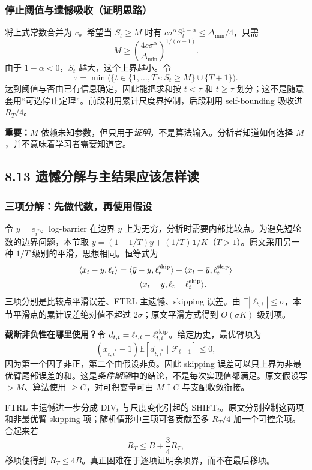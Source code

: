 \subsubsection{停止阈值与遗憾吸收（证明思路）}
将上式常数合并为 $c$。希望当 $S_t\ge M$ 时有 $c\sigma^\alpha S_t^{1-\alpha}\le\Delta_{\min}/4$，只需
\[
M\ge\left(\frac{4c\sigma^\alpha}{\Delta_{\min}}\right)^{1/(\alpha-1)}.
\]
由于 $1-\alpha<0$，$S_t$ 越大，这个上界越小。令
\[
\tau=\min\bigl(\{t\in\{1,\ldots,T\}:S_t\ge M\}\cup\{T+1\}\bigr).
\]
达到阈值与否由已有信息确定，因此能把求和按 $t<\tau$ 和 $t\ge\tau$ 划分；这不是随意套用“可选停止定理”。前段利用累计尺度界控制，后段利用 self-bounding 吸收进 $R_T/4$。

\textbf{重要：}$M$ 依赖未知参数，但只用于\emph{证明}，不是算法输入。分析者知道如何选择 $M$，并不意味着学习者需要知道它。

\subsection{8.13 遗憾分解与主结果应该怎样读}

\subsubsection{三项分解：先做代数，再使用假设}
令 $y=e_{i^*}$。log-barrier 在边界 $y$ 上为无穷，分析时需要内部比较点。为避免短轮数的边界问题，本节取
$\bar y=(1-1/T)y+(1/T)\mathbf1/K$（$T>1$）。原文采用另一种 $1/T$ 级别的平滑，思想相同。恒等式为
\begin{align*}
\langle x_t-y,\ell_t\rangle
={}&\langle\bar y-y,\ell_t^{\rm skip}\rangle
+\langle x_t-\bar y,\ell_t^{\rm skip}\rangle\\
&+\langle x_t-y,\ell_t-\ell_t^{\rm skip}\rangle.
\end{align*}
三项分别是比较点平滑误差、FTRL 主遗憾、skipping 误差。由 $\mathbb E|\ell_{t,i}|\le\sigma$，本节平滑点的累计误差绝对值不超过 $2\sigma$；原文平滑方式得到 $O(\sigma K)$ 级别项。

\textbf{截断非负性在哪里使用？}令 $d_{t,i}=\ell_{t,i}-\ell^{\rm skip}_{t,i}$。给定历史，最优臂项为
\[
(x_{t,i^*}-1)\mathbb E[d_{t,i^*}\mid\mathcal F_{t-1}]\le0,
\]
因为第一个因子非正，第二个由假设非负。因此 skipping 误差可以只上界为非最优臂尾部误差的和。这是\emph{条件期望}中的结论，不是每次实现值都满足。原文假设写 $>M$、算法使用 $\ge C$，对可积变量可由 $M\uparrow C$ 与支配收敛衔接。

FTRL 主遗憾进一步分成 $\mathrm{DIV}_t$ 与尺度变化引起的 $\mathrm{SHIFT}_t$。原文分别控制这两项和非最优臂 skipping 项；随机情形中三项可各贡献至多 $R_T/4$ 加一个可控余项。合起来若
\[
R_T\le B+\frac34R_T,
\]
移项便得到 $R_T\le4B$。真正困难在于逐项证明余项界，而不在最后移项。

